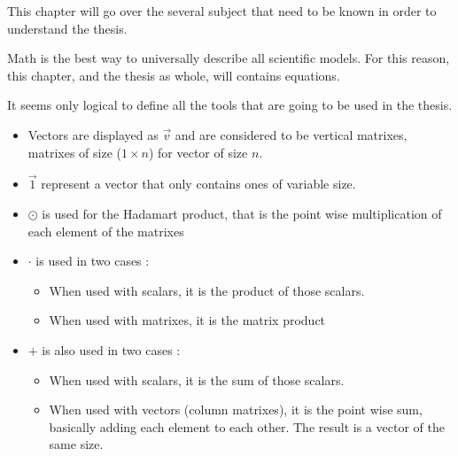 \label{cap:state}

This chapter will go over the several subject that need to be known in order to understand the thesis.

Math is the best way to universally describe all scientific models. For this reason, this chapter, and the thesis as whole, will contains equations.

It seems only logical to define all the tools that are going to be used in the thesis.

\begin{itemize}
  \item Vectors are displayed as $\overrightarrow{v}$ and are considered to be vertical matrixes, matrixes of size ($1\times n$) for vector of size $n$.
  \item $\overrightarrow{1}$ represent a vector that only contains ones of variable size.
  \item $\odot$ is used for the Hadamart product, that is the point wise multiplication of each element of the matrixes
  \item $\cdot$ is used in two cases :
    \begin{itemize}
      \item When used with scalars, it is the product of those scalars.
      \item When used with matrixes, it is the matrix product
    \end{itemize}
  \item $+$ is also used in two cases :
    \begin{itemize}
      \item When used with scalars, it is the sum of those scalars.
      \item When used with vectors (column matrixes), it is the point wise sum, basically adding each element to each other. The result is a vector of the same size.
    \end{itemize}
\end{itemize}











\cleardoublepage
